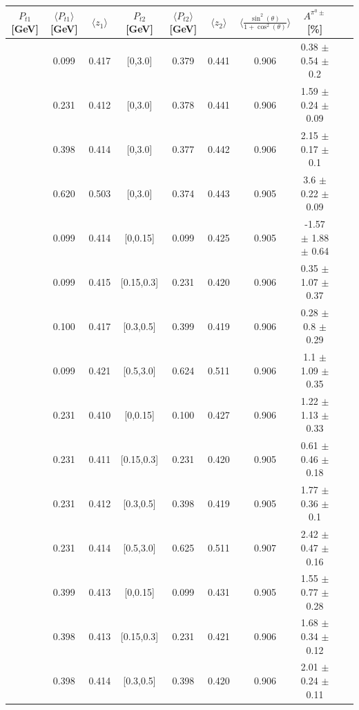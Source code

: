\begin{table}[H]\tiny
\centering
\begin{tabular}{|c| c| c| c| c| c| c| c| c| c|}
\hline
$P_{t1}$ [GeV]   & $\langle  P_{t1} \rangle$ [GeV]  & $\langle  z_1 \rangle$& $P_{t2}$ [GeV]  & $\langle  P_{t2}\rangle$ [GeV]   &  $\langle  z_2 \rangle$  &$\langle\frac{\sin^2(\theta)}{1+\cos^2(\theta)}\rangle$&  $A^{\pi^0\pm}$ [\%]  \\ \hline
[0,0.15]	&	0.099	&	0.417	&	[0,3.0]	&	0.379	&	0.441	&	0.906	&	0.38  $\pm$ 0.54  $\pm$ 0.2  	\\ \hline
[0.15,0.3]	&	0.231	&	0.412	&	[0,3.0]	&	0.378	&	0.441	&	0.906	&	1.59  $\pm$ 0.24  $\pm$ 0.09    \\ \hline
[0.3,0.5]	&	0.398	&	0.414	&	[0,3.0]	&	0.377	&	0.442	&	0.906	&	2.15  $\pm$ 0.17  $\pm$ 0.1     \\ \hline
[0.5,3.0]	&	0.620	&	0.503	&	[0,3.0]	&	0.374	&	0.443	&	0.905	&	3.6  $\pm$ 0.22  $\pm$ 0.09     \\ \hline
\hline
[0,0.15]	&	0.099	&	0.414	&	[0,0.15]	&	0.099	&	0.425	&	0.905	&-1.57  $\pm$ 1.88  $\pm$ 0.64   	\\ \hline
[0,0.15]	&	0.099	&	0.415	&	[0.15,0.3]	&	0.231	&	0.420	&	0.906	&0.35  $\pm$ 1.07  $\pm$ 0.37    	\\ \hline
[0,0.15]	&	0.100	&	0.417	&	[0.3,0.5]	&	0.399	&	0.419	&	0.906	&0.28  $\pm$ 0.8  $\pm$ 0.29     	\\ \hline
[0,0.15]	&	0.099	&	0.421	&	[0.5,3.0]	&	0.624	&	0.511	&	0.906	&1.1  $\pm$ 1.09  $\pm$ 0.35         	\\ \hline
\hline
[0.15,0.3]	&	0.231	&	0.410	&	[0,0.15]	&	0.100	&	0.427	&	0.906	&1.22  $\pm$ 1.13  $\pm$ 0.33    	\\ \hline
[0.15,0.3]	&	0.231	&	0.411	&	[0.15,0.3]	&	0.231	&	0.420	&	0.905	&0.61  $\pm$ 0.46  $\pm$ 0.18        	\\ \hline
[0.15,0.3]	&	0.231	&	0.412	&	[0.3,0.5]	&	0.398	&	0.419	&	0.905	&1.77  $\pm$ 0.36  $\pm$ 0.1     	\\ \hline
[0.15,0.3]	&	0.231	&	0.414	&	[0.5,3.0]	&	0.625	&	0.511	&	0.907	&2.42  $\pm$ 0.47  $\pm$ 0.16    	\\ \hline
\hline
[0.3,0.5]	&	0.399	&	0.413	&	[0,0.15]	&	0.099	&	0.431	&	0.905	&1.55  $\pm$ 0.77  $\pm$ 0.28    	\\ \hline
[0.3,0.5]	&	0.398	&	0.413	&	[0.15,0.3]	&	0.231	&	0.421	&	0.906	&1.68  $\pm$ 0.34  $\pm$ 0.12    	\\ \hline
[0.3,0.5]	&	0.398	&	0.414	&	[0.3,0.5]	&	0.398	&	0.420	&	0.906	&2.01  $\pm$ 0.24  $\pm$ 0.11    	\\ \hline

\end{tabular}
\end{table}
